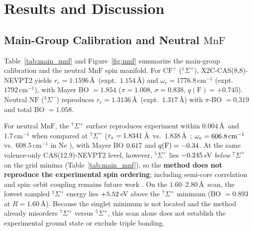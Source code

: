 \documentclass[10pt,twocolumn]{article}
\begin{document}
\section{Results and Discussion}

\subsection{Main-Group Calibration and Neutral $\mathrm{MnF}$}
Table~\ref{tab:main_mnf} and Figure~\ref{fig:mnf} summarize the main-group calibration and the neutral $\mathrm{MnF}$ spin manifold. For $\mathrm{CF}^+$ ($^1\Sigma^+$), X2C-CAS(8,8)-NEVPT2 yields $r_e = 1.1596\,$\AA\ (expt.\ $1.154\,$\AA) and $\omega_e = 1776.8\,\mathrm{cm}^{-1}$ (expt.\ $1792\,\mathrm{cm}^{-1}$), with Mayer BO $= 1.854$ ($\pi = 1.008$, $\sigma = 0.838$, $q(\mathrm{F}) = +0.745$). Neutral $\mathrm{NF}$ ($^3\Sigma^-$) reproduces $r_e = 1.3136\,$\AA\ (expt.\ $1.317\,$\AA) with $\pi$-BO $= 0.319$ and total BO $= 1.058$.

For neutral $\mathrm{MnF}$, the $^7\Sigma^+$ surface reproduces experiment within $0.004\,$\AA\ and $1.7\,\mathrm{cm}^{-1}$ when compared at $^7\Sigma^+$ ($r_e = 1.8341\,$\AA\ vs.\ $1.838\,$\AA\ \cite{sheridan2003}; $\omega_e = 606.8\,\mathrm{cm}^{-1}$ vs.\ $608.5\,\mathrm{cm}^{-1}$ in Ne \cite{brosi2016}), with Mayer BO $0.617$ and $q(\mathrm{F})=-0.34$. At the same valence-only CAS(12,9)-NEVPT2 level, however, $^5\Sigma^+$ lies $-0.245\,$eV \emph{below} $^7\Sigma^+$ on the grid minima (Table~\ref{tab:main_mnf}), so the \textbf{method does not reproduce the experimental spin ordering}; including semi-core correlation and spin--orbit coupling remains future work \cite{koukounas2004}. On the $1.60$--$2.80\,$\AA\ scan, the lowest sampled $^1\Sigma^+$ energy lies $+5.52\,$eV above the $^7\Sigma^+$ minimum (BO $= 0.893$ at $R=1.60\,$\AA). Because the singlet minimum is not located and the method already misorders $^7\Sigma^+$ versus $^5\Sigma^+$, this scan alone does not establish the experimental ground state or exclude triple bonding.
\end{document}
